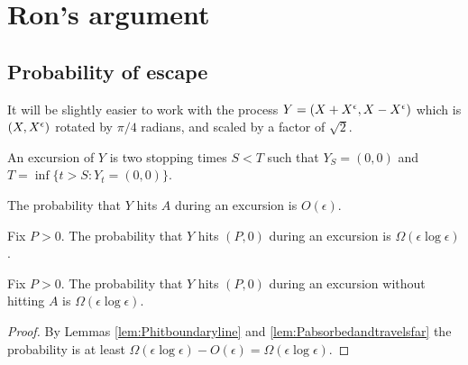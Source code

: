 {
\section{Ron's argument}

\newcommand{\bandwidth}{\delta}
\newcommand{\rotproc}{Y}

\newcommand{\union}{\cup}
\renewcommand{\L}{L^+ \union L^-}
\newcommand{\Le}{L^\epsilon}

\subsection{Probability of escape}

It will be slightly easier to work with the process $\rotproc =
(\sampled + \resamplede, \sampled - \resamplede)$ which is $(X,
X^{\epsilon})$ rotated by $\pi / 4$ radians, and scaled by a factor of
$\sqrt{2}$.

\newcommand{\boundarylines}{A}

\begin{definition}
  An excursion of $Y$ is two stopping times $S < T$ such that $Y_S =
  (0,0)$ and $T = \inf\{ t > S : Y_t = (0,0) \}$.  
\end{definition}

\begin{lemma}
  \label{lem:Phitboundaryline}
  The probability that $Y$ hits $\boundarylines$ during an excursion
  is $O(\epsilon)$.
\end{lemma}

\newcommand{\Omegaeloge}{\Omega(\epsilon\log\epsilon)}

\begin{lemma}
  \label{lem:Pabsorbedandtravelsfar}
  Fix $P > 0$.  The probability that $Y$ hits $(P,0)$ during an
  excursion is $\Omegaeloge$.
\end{lemma}

\begin{lemma}
  Fix $P > 0$.  The probability that $Y$ hits $(P,0)$ during an
  excursion without hitting $A$ is $\Omegaeloge$.
\end{lemma}

\begin{proof}
  By Lemmas \ref{lem:Phitboundaryline} and
  \ref{lem:Pabsorbedandtravelsfar} the probability is at least
  $\Omegaeloge - O(\epsilon) = \Omegaeloge$.
\end{proof}

}

